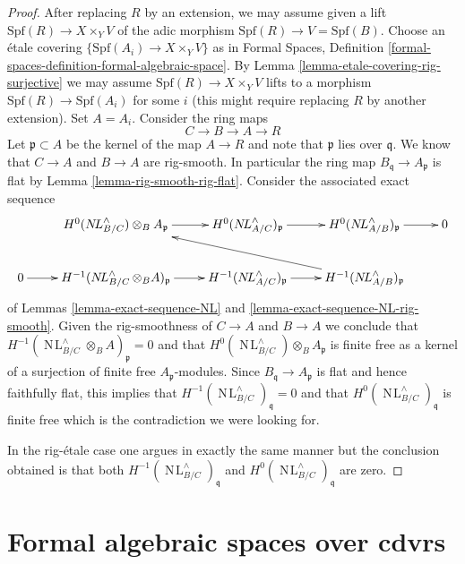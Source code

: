 \documentclass{stacks-project}
\theoremstyle{plain}
\theoremstyle{definition}
\theoremstyle{remark}
\numberwithin{equation}{subsection}
\def\NL{\mathop{N\!L}\nolimits}
\begin{document}
\begin{proof}
\medskip\noindent
After replacing $R$ by an extension, we may assume given a lift
$\text{Spf}(R) \to X \times_Y V$ of the adic morphism
$\text{Spf}(R) \to V = \text{Spf}(B)$. Choose an \'etale
covering $\{\text{Spf}(A_i) \to X \times_Y V\}$ as in
Formal Spaces, Definition
\ref{formal-spaces-definition-formal-algebraic-space}.
By Lemma \ref{lemma-etale-covering-rig-surjective}
we may assume $\text{Spf}(R) \to X \times_Y V$ lifts to a
morphism $\text{Spf}(R) \to \text{Spf}(A_i)$ for some $i$
(this might require replacing $R$ by another extension).
Set $A = A_i$. Consider the ring maps
$$
C \to B \to A \to R
$$
Let $\mathfrak p \subset A$ be the kernel of the map
$A \to R$ and note that $\mathfrak p$ lies over $\mathfrak q$.
We know that $C \to A$ and $B \to A$ are rig-smooth.
In particular the ring map $B_\mathfrak q \to A_\mathfrak p$
is flat by Lemma \ref{lemma-rig-smooth-rig-flat}.
Consider the associated exact sequence
$$
\xymatrix{
&
H^0(\NL_{B/C}^\wedge) \otimes_B A_\mathfrak p \ar[r] &
H^0(\NL_{A/C}^\wedge)_\mathfrak p \ar[r] &
H^0(\NL_{A/B}^\wedge)_\mathfrak p \ar[r] & 0 \\
0 \ar[r] &
H^{-1}(\NL_{B/C}^\wedge \otimes_B A)_\mathfrak p \ar[r] &
H^{-1}(\NL_{A/C}^\wedge)_\mathfrak p \ar[r] &
H^{-1}(\NL_{A/B}^\wedge)_\mathfrak p \ar[llu]
}
$$
of Lemmas \ref{lemma-exact-sequence-NL} and
\ref{lemma-exact-sequence-NL-rig-smooth}.
Given the rig-smoothness of $C \to A$ and $B \to A$
we conclude that $H^{-1}(\NL_{B/C}^\wedge \otimes_B A)_\mathfrak p = 0$
and that $H^0(\NL_{B/C}^\wedge) \otimes_B A_\mathfrak p$
is finite free as a kernel of a surjection of finite free
$A_\mathfrak p$-modules. Since $B_\mathfrak q \to A_\mathfrak p$
is flat and hence faithfully flat, this implies that
$H^{-1}(\NL_{B/C}^\wedge)_\mathfrak q = 0$
and that $H^0(\NL_{B/C}^\wedge)_\mathfrak q$
is finite free which is the contradiction we were looking for.

\medskip\noindent
In the rig-\'etale case one argues in exactly the same manner
but the conclusion obtained is that both
$H^{-1}(\NL_{B/C}^\wedge)_\mathfrak q$
and $H^0(\NL_{B/C}^\wedge)_\mathfrak q$ are zero.
\end{proof}







\section{Formal algebraic spaces over cdvrs}
\label{section-over-cdrv}
\end{document}
